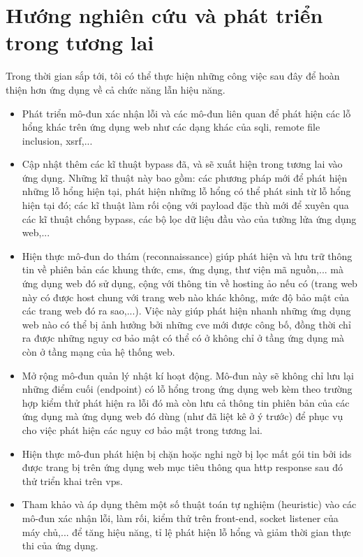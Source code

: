 \section{Hướng nghiên cứu và phát triển trong tương lai}
Trong thời gian sắp tới, tôi có thể thực hiện những công việc sau đây để hoàn thiện hơn ứng dụng về cả chức năng lẫn hiệu năng.
\begin{itemize}
    \item Phát triển mô-đun xác nhận lỗi và các mô-đun liên quan để phát hiện các lỗ hổng khác trên ứng dụng web như các dạng khác của \acrshort{sqli}, remote file inclusion, \acrshort{xsrf},...
    \item Cập nhật thêm các kĩ thuật bypass đã, và sẽ xuất hiện trong tương lai vào ứng dụng. Những kĩ thuật này bao gồm: các phương pháp mới để phát hiện những lỗ hổng hiện tại, phát hiện những lỗ hổng có thể phát sinh từ lỗ hổng hiện tại đó; các kĩ thuật làm rối cộng với payload đặc thù mới để xuyên qua các kĩ thuật chống bypass, các bộ lọc dữ liệu đầu vào của tường lửa ứng dụng web,...
    \item Hiện thực mô-đun do thám (reconnaissance) giúp phát hiện và lưu trữ thông tin về phiên bản các khung thức, \acrshort{cms}, ứng dụng, thư viện mã nguồn,... mà ứng dụng web đó sử dụng, cộng với thông tin về hosting ảo nếu có (trang web này có được host chung với trang web nào khác không, mức độ bảo mật của các trang web đó ra sao,...). Việc này giúp phát hiện nhanh những ứng dụng web nào có thể bị ảnh hưởng bởi những \acrshort{cve} mới được công bố, đồng thời chỉ ra được những nguy cơ bảo mật có thể có ở không chỉ ở tầng ứng dụng mà còn ở tầng mạng của hệ thống web.
    \item Mở rộng mô-đun quản lý nhật kí hoạt động. Mô-đun này sẽ không chỉ lưu lại những điểm cuối (endpoint) có lỗ hổng trong ứng dụng web kèm theo trường hợp kiểm thử phát hiện ra lỗi đó mà còn lưu cả thông tin phiên bản của các ứng dụng mà ứng dụng web đó dùng (như đã liệt kê ở ý trước) để phục vụ cho việc phát hiện các nguy cơ bảo mật trong tương lai.
    \item Hiện thực mô-đun phát hiện bị chặn hoặc nghi ngờ bị lọc mất gói tin bởi \acrshort{ids} được trang bị trên ứng dụng web mục tiêu thông qua \acrshort{http} response sau đó thử triển khai trên \acrshort{vps}.
    \item Tham khảo và áp dụng thêm một số thuật toán tự nghiệm (heuristic) vào các mô-đun xác nhận lỗi, làm rối, kiểm thử trên front-end, socket listener của máy chủ,... để tăng hiệu năng, tỉ lệ phát hiện lỗ hổng và giảm thời gian thực thi của ứng dụng.
\end{itemize}